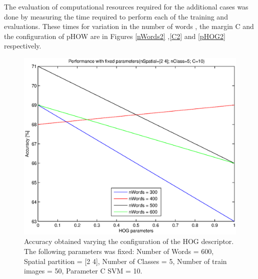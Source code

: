 \documentclass[10pt,twocolumn,letterpaper]{article}
\begin{document}
The evaluation of computational resources required for the additional cases was done by measuring the time required to perform each of the training and evaluations. These times for variation in the number of words , the margin C and the configuration of pHOW are in Figures \ref{nWords2} ,\ref{C2} and \ref{pHOG2} respectively.

\begin{figure}[h]
\begin{center}
\includegraphics[width=1\linewidth]{images/pHOG1.eps}
\end{center}
   \caption{
Accuracy obtained varying the configuration of the HOG descriptor. The following parameters was fixed: Number of Words = 600, Spatial partition = [2 4], Number of Classes = 5, Number of train images = 50, Parameter C SVM = 10.
   }
\label{pHOG1}
\end{figure}
\end{document}
